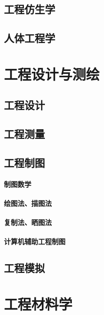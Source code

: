 \documentclass[UTF8]{../../ApplicationUniverse}
\begin{document}
\section{工程仿生学}
\section{人体工程学}









\chapter{工程设计与测绘}
\section{工程设计}
\section{工程测量}
\section{工程制图}
    \subsubsection{制图数学}
    \subsubsection{绘图法、描图法}
    \subsubsection{复制法、晒图法}
    \subsubsection{计算机辅助工程制图}
\section{工程模拟}









\chapter{工程材料学}
\end{document}
